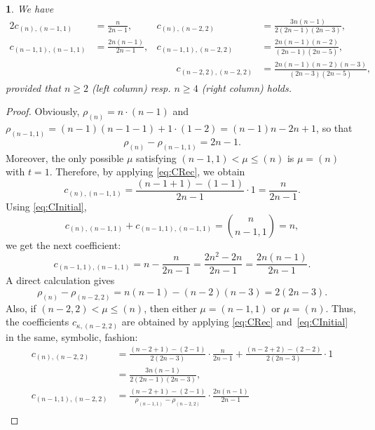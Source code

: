 \documentclass[10pt,oneside,american]{amsart}
\numberwithin{equation}{section}
\numberwithin{figure}{section}
\theoremstyle{definition}
\theoremstyle{remark}
\theoremstyle{plain}
\theoremstyle{definition}
\theoremstyle{plain}
\newtheorem{thm}{\protect\theoremname}[section]
\theoremstyle{plain}
\theoremstyle{plain}
\providecommand{\theoremname}{Theorem}
\begin{document}
\begin{thm}
\label{thm:fam1}
We have
\begin{alignat*}{2}
  c_{(n),(n-1,1)} &= \frac{n}{2n-1}, &
  c_{(n),(n-2,2)} &= \frac{3n(n-1)}{2(2n-1)(2n-3)}, \\
  c_{(n-1,1),(n-1,1)} &= \frac{2n(n-1)}{2n-1}, &
  c_{(n-1,1),(n-2,2)} &= \frac{2n(n-1)(n-2)}{(2n-1)(2n-5)}, \\
  &&\qquad
  c_{(n-2,2),(n-2,2)} &= \frac{2n(n-1)(n-2)(n-3)}{(2n-3)(2n-5)},
\end{alignat*}
provided that $n\geq2$ (left column) resp. $n\geq4$ (right column) holds.
\end{thm}
\begin{proof}
Obviously, $\rho_{\left(n\right)}=n\cdot\left(n-1\right)$ and
$\rho_{\left(n-1,1\right)}=\left(n-1\right)\left(n-1-1\right)+1\cdot\left(1-2\right)=\left(n-1\right)n-2n+1$,
so that 
\[
  \rho_{\left(n\right)}-\rho_{\left(n-1,1\right)}=2n-1.
\]
Moreover, the only possible $\mu$ satisfying $\left(n-1,1\right)<\mu\leq\left(n\right)$
is $\mu=\left(n\right)$ with $t=1$. Therefore,  by applying \eqref{eq:CRec}, we obtain
\[
  c_{\left(n\right),\left(n-1,1\right)}=\frac{\left(n-1+1\right)-\left(1-1\right)}{2n-1}\cdot1=\frac{n}{2n-1}.
\]
Using \eqref{eq:CInitial},
\[
  c_{\left(n\right),\left(n-1,1\right)}+c_{\left(n-1,1\right),\left(n-1,1\right)}=\binom{n}{n-1,1}=n,
\]
we get the next coefficient:
\[
  c_{\left(n-1,1\right),\left(n-1,1\right)}=n-\frac{n}{2n-1}=\frac{2n^{2}-2n}{2n-1}=\frac{2n\left(n-1\right)}{2n-1}.
\]
A direct calculation gives 
\[
  \rho_{\left(n\right)}-\rho_{\left(n-2,2\right)} =
  n\left(n-1\right)-\left(n-2\right)\left(n-3\right) =
  2\left(2n-3\right).
\]
Also, if $\left(n-2,2\right)<\mu\leq\left(n\right)$, then either
$\mu=\left(n-1,1\right)$ or $\mu=\left(n\right)$. Thus, the coefficients
$c_{\kappa,(n-2,2)}$ are obtained by applying \eqref{eq:CRec} and~\eqref{eq:CInitial}
in the same, symbolic, fashion:
\begin{align*}
  c_{\left(n\right),\left(n-2,2\right)} 
  &= \frac{\left(n-2+1\right)-\left(2-1\right)}{2\left(2n-3\right)}\cdot\frac{n}{2n-1}+\frac{\left(n-2+2\right)-\left(2-2\right)}{2\left(2n-3\right)}\cdot1\\
  &= \frac{3n\left(n-1\right)}{2\left(2n-1\right)\left(2n-3\right)},\\
  c_{\left(n-1,1\right),\left(n-2,2\right)}
  &= \frac{\left(n-2+1\right)-\left(2-1\right)}{\rho_{\left(n-1,1\right)}-\rho_{\left(n-2,2\right)}}\cdot\frac{2n\left(n-1\right)}{2n-1}\\

\end{align*}
\end{proof}
\end{document}
